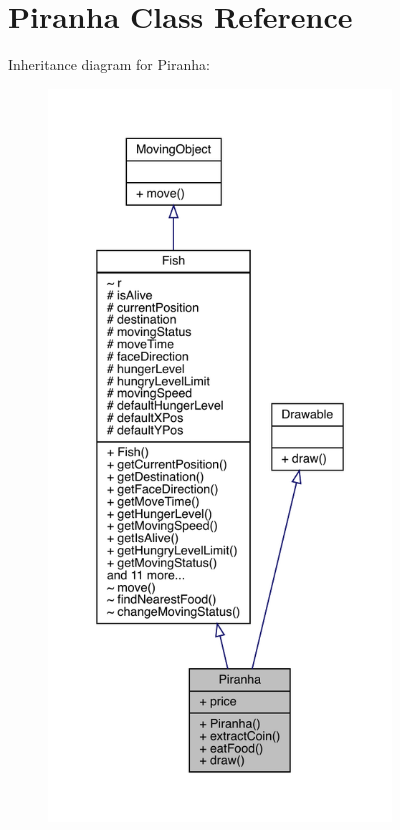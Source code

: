 \hypertarget{class_piranha}{}\section{Piranha Class Reference}
\label{class_piranha}


Inheritance diagram for Piranha\+:
\nopagebreak
\begin{figure}[H]
\begin{center}
\leavevmode
\includegraphics[height=550pt]{class_piranha__inherit__graph}
\end{center}
\end{figure}


